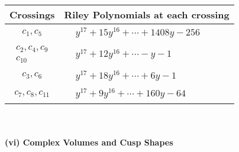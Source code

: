 \documentclass[1p]{elsarticle_modified}
\theoremstyle{definition}
\begin{document}
\begin{tabular}{m{50pt}|m{274pt}}
Crossings & \hspace{64pt}Riley Polynomials at each crossing \\
\hline $$\begin{aligned}c_{1},c_{5}\end{aligned}$$&$\begin{aligned}
&y^{17}+15 y^{16}+\cdots+1408 y-256
\end{aligned}$\\
\hline $$\begin{aligned}c_{2},c_{4},c_{9}\\c_{10}\end{aligned}$$&$\begin{aligned}
&y^{17}+12 y^{16}+\cdots- y-1
\end{aligned}$\\
\hline $$\begin{aligned}c_{3},c_{6}\end{aligned}$$&$\begin{aligned}
&y^{17}+18 y^{16}+\cdots+6 y-1
\end{aligned}$\\
\hline $$\begin{aligned}c_{7},c_{8},c_{11}\end{aligned}$$&$\begin{aligned}
&y^{17}+9 y^{16}+\cdots+160 y-64
\end{aligned}$\\
\hline
\end{tabular}\\~\\
\newpage\flushleft \textbf{(vi) Complex Volumes and Cusp Shapes}
\end{document}
